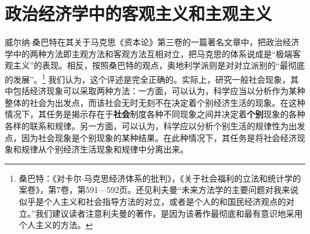 \documentclass[fontset=fandol, a4paper, 12pt, openright]{ctexbook}
\begin{document}
\section{政治经济学中的客观主义和主观主义}

威尔纳$\cdot$桑巴特在其关于马克思《资本论》第三卷的一篇著名文章中，把政治经济学中的两种方法即主观方法和客观方法互相对立，把马克思的体系说成是“极端客观主义”的表现。相反，按照桑巴特的观点，奥地利学派则是对对立派别的“最彻底的发展”。\footnote{桑巴特：《对卡尔$\cdot$马克思经济体系的批判》，《关于社会福利的立法和统计学的案卷》，第7卷，第591—592页。还见利夫曼“未来方法学的主要问题对我来说似乎是个人主义和社会指导方法的对立，或者是个人的和国民经济观点的对立。”我们建议读者注意利夫曼的著作，是因为该著作最彻底和最有意识地采用个人主义的方法。} 我们认为，这个评述是完全正确的。实际上，研究一般社会现象，其中包括经济现象可以采取两种方法：一方面，可以认为，科学应当以分析作为某种整体的社会为出发点，而该社会无时无刻不在决定着个别经济生活的现象。在这种情况下，其任务是揭示存在于\textbf{社会}制度各种不同现象之间并决定着\textbf{个别}现象的各种各样的联系和规律。另一方面，可以认为，科学应以分析个别生活的规律性为出发点，因为社会现象是个别现象的某种结果。在此种情况下，其任务是将社会经济现象和规律从个别经济生活现象和规律中分离出来。
\end{document}
